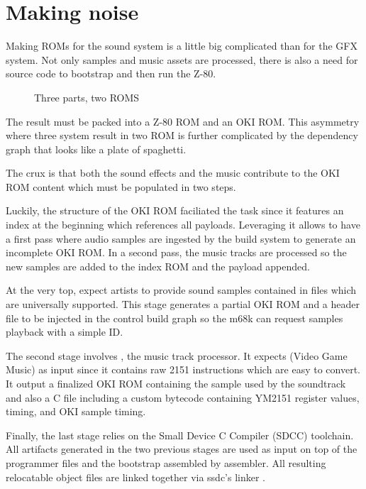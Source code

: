\chapter{Making noise}
Making ROMs for the sound system is a little big complicated than for the GFX system. Not only samples and music assets are processed, there is also a need for source code to bootstrap and then run the Z-80. 

\begin{figure}[H]
\caption*{Three parts, two ROMS}
\end{figure}

The result must be packed into a Z-80 ROM and an OKI ROM. This asymmetry where three system result in two ROM is further complicated by the dependency graph that looks like a plate of spaghetti. 

The crux is that both the sound effects and the music contribute to the OKI ROM content which must be populated in two steps.




Luckily, the structure of the OKI ROM faciliated the task since it features an index at the beginning which references all payloads. Leveraging it allows to have a first pass where audio samples are ingested by the build system to generate an incomplete OKI ROM. In a second pass, the music tracks are processed so the new samples are added to the index ROM and the payload appended.

At the very top,  expect artists to provide sound samples contained in  files which are universally supported. This stage generates a partial OKI ROM and a  header file to be injected in the control build graph so the m68k can request samples playback with a simple ID.

The second stage involves , the music track processor. It expects  (Video Game Music) as input since it contains raw 2151 instructions which are easy to convert. It output a finalized OKI ROM containing the sample used by the soundtrack and also a  C file including a custom bytecode containing YM2151 register values, timing, and OKI sample timing.

Finally, the last stage relies on the Small Device C Compiler (SDCC) toolchain. All artifacts generated in the two previous stages are used as input on top of the programmer  files and the bootstrap  assembled by  assembler. All resulting relocatable object files  are linked together via ssdc's linker . 


